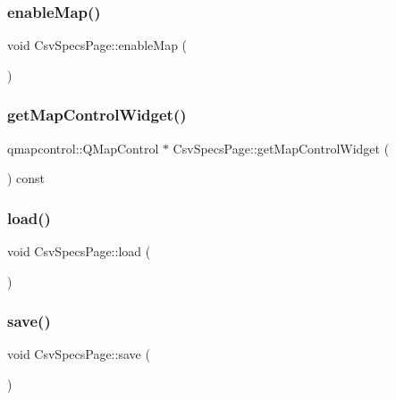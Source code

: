 \subsubsection{\texorpdfstring{enableMap()}{enableMap()}}
{\footnotesize\ttfamily void Csv\+Specs\+Page\+::enable\+Map (\begin{DoxyParamCaption}{ }\end{DoxyParamCaption})}

\mbox{\label{class_csv_specs_page_a5b46149c6dbbfaae4d2fd6d6ed6696f7}} 
\subsubsection{\texorpdfstring{getMapControlWidget()}{getMapControlWidget()}}
{\footnotesize\ttfamily qmapcontrol\+::\+Q\+Map\+Control $\ast$ Csv\+Specs\+Page\+::get\+Map\+Control\+Widget (\begin{DoxyParamCaption}{ }\end{DoxyParamCaption}) const}

\mbox{\label{class_csv_specs_page_acfb8c42c4b7db4ebed29d3dea52fca2a}} 
\subsubsection{\texorpdfstring{load()}{load()}}
{\footnotesize\ttfamily void Csv\+Specs\+Page\+::load (\begin{DoxyParamCaption}{ }\end{DoxyParamCaption})}

\mbox{\label{class_csv_specs_page_a035dbde7166d98157cf8481c71a487a3}} 
\subsubsection{\texorpdfstring{save()}{save()}}
{\footnotesize\ttfamily void Csv\+Specs\+Page\+::save (\begin{DoxyParamCaption}{ }\end{DoxyParamCaption})}

